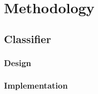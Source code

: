 
\section{Methodology}






\subsection{Classifier}
\subsubsection{Design}
\subsubsection{Implementation}